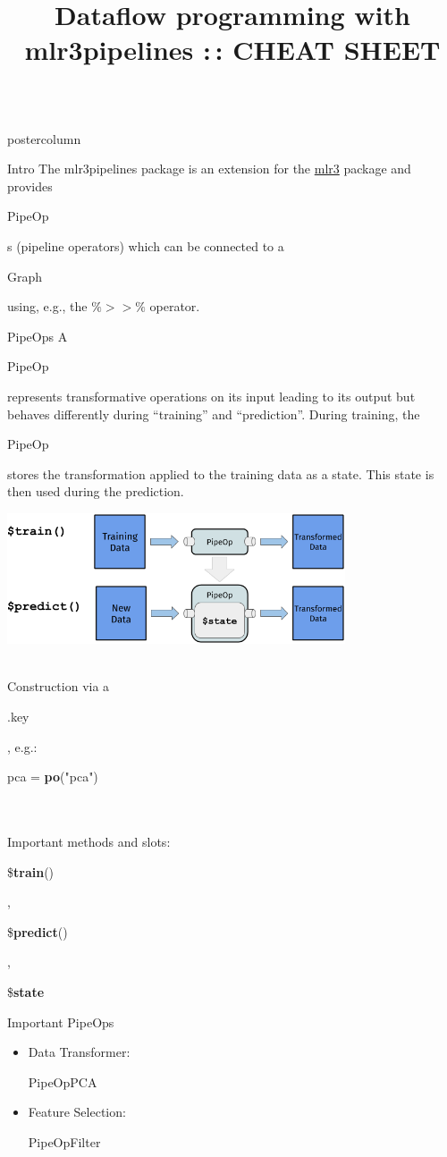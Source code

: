 \documentclass{beamer}
\title{Dataflow programming with mlr3pipelines :\,: CHEAT SHEET} %
\newlength{\columnheight} %
\newcommand{\codeinline}[1]{\begin{codeboxinline}#1\end{codeboxinline}}
\begin{document}
\begin{frame}[fragile]{}
	\begin{columns}
		\begin{column}{.245\textwidth}
			\begin{beamercolorbox}[center]{postercolumn}
				\begin{minipage}{.98\textwidth}
					\parbox[t][\columnheight]{\textwidth}{
						\begin{myblock}{Intro}
              The mlr3pipelines package is an extension for the \href{https://github.com/mlr-org/mlr3}{mlr3} package and provides \codeinline{PipeOp}s (pipeline operators) which can be connected to a \codeinline{Graph} using, e.g., the $\%>>\%$ operator.
            \end{myblock}
						\begin{myblock}{PipeOps}
              A \codeinline{PipeOp} represents transformative operations on its input leading to its output but behaves differently during ``training'' and ``prediction''. During training, the \codeinline{PipeOp} stores the transformation applied to the training data as a state. This state is then used during the prediction.
              \begin{center}
                \includegraphics[width=0.75\textwidth]{img/po.png}
              \end{center}
              \ \\
              Construction via a \codeinline{.key}, e.g.: \codeinline{pca = \textbf{po}("pca")}\\
              \ \\
              Important methods and slots:\\
              \codeinline{\$\textbf{train}()}, \codeinline{\$\textbf{predict}()}, \codeinline{\$\textbf{state}}
						\end{myblock}
            \begin{myblock}{Important PipeOps}
              \begin{itemize}
                \item Data Transformer: \codeinline{PipeOpPCA}
                \item Feature Selection: \codeinline{PipeOpFilter}

\end{itemize}
\end{myblock}}
\end{minipage}
\end{beamercolorbox}
\end{column}
\end{columns}
\end{frame}
\end{document}
